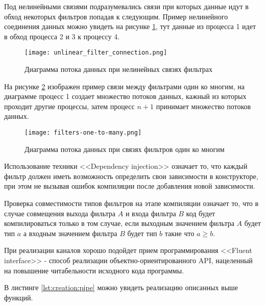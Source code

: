 Под нелинейными связями подразумевались связи при которых данные идут в обход некоторых фильтров попадая к следующим. Пример нелинейного соединения данных можно увидеть на рисунке \ref{fig:creation:unlinear_filter_connection}, тут данные из процесса 1 идет в обход процесса 2 и 3 к процессу 4.
\begin{figure}[ht] 
    \centering
    \texttt{[image: unlinear\_filter\_connection.png]}  
    \caption{Диаграмма потока данных при нелинейных связях фильтрах}
    \label{fig:creation:unlinear_filter_connection}
\end{figure}

На рисунке \ref{fig:creation:filters-one-to-many} изображен пример связи между фильтрами один ко многим, на диаграмме процесс 1 создает множество потоков данных, кажный из которых проходит другие процессы, затем процесс $n+1$ принимает множество потоков данных.
\begin{figure}[ht] 
    \centering
    \texttt{[image: filters-one-to-many.png]}  
    \caption{Диаграмма потока данных при связях фильтров один ко многим}
    \label{fig:creation:filters-one-to-many}
\end{figure}

Использование техники <<Dependency injection>> означает то, что каждый фильтр должен иметь возможность определить свои зависимости в конструкторе, при этом не вызывая ошибок компиляции после добавления новой зависимости.

Проверка совместимости типов фильтров на этапе компиляции означает то, что в случае совмещения выхода фильтра $A$ и входа фильтра $B$ код будет компилироваться только в том случае, если выходным значением фильтра $A$ будет тип $a$ а входным значением фильтра $B$ будет тип $b$ такие что $a \geq b$.

При реализации каналов хорошо подойдет прием программирования <<Fluent interface>> - способ реализации объектно-ориентированного API, нацеленный на повышение читабельности исходного кода программы.

В листинге \ref{lst:creation:pipe} можно увидеть реализацию описанных выше функций.

